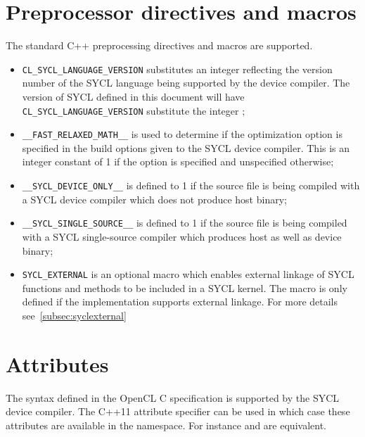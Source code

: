 \section{Preprocessor directives and macros}

The standard C++ preprocessing directives and macros are supported.

\begin{itemize}
\item \texttt{CL_SYCL_LANGUAGE_VERSION} substitutes an integer reflecting
  the version number of the SYCL language being supported by the device
  compiler. The version of SYCL defined in this document will have
  \texttt{CL_SYCL_LANGUAGE_VERSION} substitute the integer \SYCLLANGVERSION;

\item \texttt{__FAST_RELAXED_MATH__} is used to determine if the
   optimization option is specified in the build
  options given to the SYCL device compiler. This is an integer constant
  of 1 if the option is specified and unspecified otherwise;

\item \texttt{__SYCL_DEVICE_ONLY__} is defined to 1 if the source file is
  being compiled with a SYCL device compiler which does not produce host
  binary;

\item \texttt{__SYCL_SINGLE_SOURCE__} is defined to 1 if the source file
  is being compiled with a SYCL single-source compiler which produces host
  as well as device binary;

\item \texttt{SYCL_EXTERNAL} is an optional macro which enables external
  linkage of SYCL functions and methods to be included in a SYCL kernel.
  The macro is only defined if the implementation supports external linkage.
  For more details see~\ref{subsec:syclexternal}

\end{itemize}

\section{Attributes}
The  syntax defined in the OpenCL C specification is supported by the SYCL device compiler.
The C++11 attribute specifier can be used in which case these attributes are available in the  namespace.
For instance  and  are equivalent.

